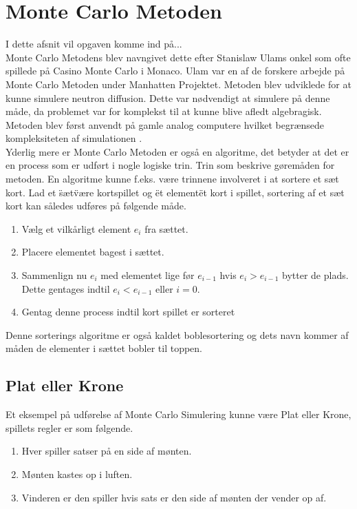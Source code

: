 \documentclass[../../SRP.tex]{subfiles}
\begin{document}
\chapter{Monte Carlo Metoden}

I dette afsnit vil opgaven komme ind på... \\

Monte Carlo Metodens blev navngivet dette efter Stanislaw Ulams onkel som ofte spillede på Casino Monte Carlo i Monaco. Ulam var en af de forskere arbejde på Monte Carlo Metoden under Manhatten Projektet. Metoden blev udviklede for at kunne simulere neutron diffusion. Dette var nødvendigt at simulere på denne måde, da problemet var for komplekst til at kunne blive afledt algebragisk. Metoden blev først anvendt på gamle analog computere hvilket begrænsede kompleksiteten af simulationen \cite{AHF}. \\

Yderlig mere er Monte Carlo Metoden er også en algoritme, det betyder at det er en process som er udført i nogle logiske trin. Trin som beskrive gøremåden for metoden. En algoritme kunne f.eks. være trinnene involveret i at sortere et sæt kort. Lad et \"sæt\" være kortspillet og \"et element\" et kort i spillet, sortering af et sæt kort kan således udføres på følgende måde.
\begin{enumerate}
  \item Vælg et vilkårligt element $e_i$ fra sættet.
  
  \item Placere elementet bagest i sættet.

  \item Sammenlign nu $e_i$ med elementet lige før $e_{i-1}$ hvis $e_i > e_{i-1}$ bytter de plads. Dette gentages indtil $e_i < e_{i-1}$ eller $i = 0$.

  \item Gentag denne process indtil kort spillet er sorteret
\end{enumerate}
Denne sorterings algoritme er også kaldet boblesortering og dets navn kommer af måden de elementer i sættet bobler til toppen. \cite{BS} \\

\section{Plat eller Krone}
Et eksempel på udførelse af Monte Carlo Simulering kunne være Plat eller Krone, spillets regler er som følgende.
\begin{enumerate}
  \item Hver spiller satser på en side af mønten.

  \item Mønten kastes op i luften.

  \item Vinderen er den spiller hvis sats er den side af mønten der vender op af.
\end{enumerate}
\end{document}
